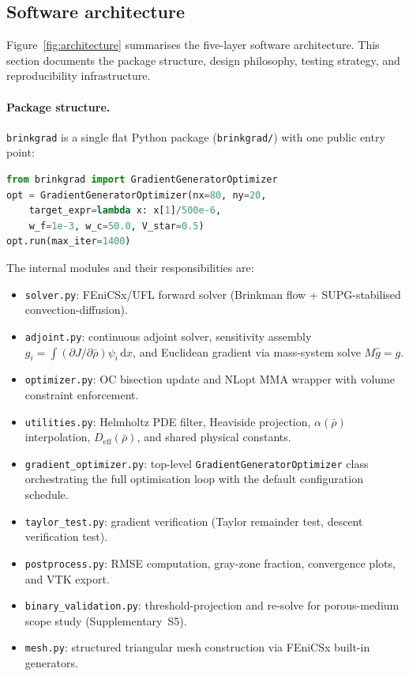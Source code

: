 \subsection{Software architecture}
\label{sec:software_architecture}

Figure~\ref{fig:architecture} summarises the five-layer software architecture.
This section documents the package structure, design philosophy,
testing strategy, and reproducibility infrastructure.

\paragraph{Package structure.}
\texttt{brinkgrad} is a single flat Python package
(\texttt{brinkgrad/}) with one public entry point:

\begin{lstlisting}[language=Python,breaklines=true]
from brinkgrad import GradientGeneratorOptimizer
opt = GradientGeneratorOptimizer(nx=80, ny=20,
    target_expr=lambda x: x[1]/500e-6,
    w_f=1e-3, w_c=50.0, V_star=0.5)
opt.run(max_iter=1400)
\end{lstlisting}

\noindent
The internal modules and their responsibilities are:

\begin{itemize}\itemsep2pt
    \item \texttt{solver.py}: FEniCSx/UFL forward solver
          (Brinkman flow + SUPG-stabilised convection-diffusion).
    \item \texttt{adjoint.py}: continuous adjoint solver,
          sensitivity assembly $g_i=\int(\partial J/\partial\bar\rho)\psi_i\,\mathrm{d}x$,
          and Euclidean gradient via mass-system solve $M\hat{g}=g$.
    \item \texttt{optimizer.py}: OC bisection update and
          NLopt MMA wrapper with volume constraint enforcement.
    \item \texttt{utilities.py}: Helmholtz PDE filter,
          Heaviside projection, $\alpha(\bar\rho)$ interpolation,
          $D_{\mathrm{eff}}(\bar\rho)$, and shared physical constants.
    \item \texttt{gradient\_optimizer.py}: top-level
          \texttt{GradientGeneratorOptimizer} class orchestrating
          the full optimisation loop with the default configuration schedule.
    \item \texttt{taylor\_test.py}: gradient verification
          (Taylor remainder test, descent verification test).
    \item \texttt{postprocess.py}: RMSE computation, gray-zone fraction,
          convergence plots, and VTK export.
    \item \texttt{binary\_validation.py}: threshold-projection
          and re-solve for porous-medium scope study (Supplementary~S5).
    \item \texttt{mesh.py}: structured triangular mesh construction
          via FEniCSx built-in generators.
\end{itemize}

